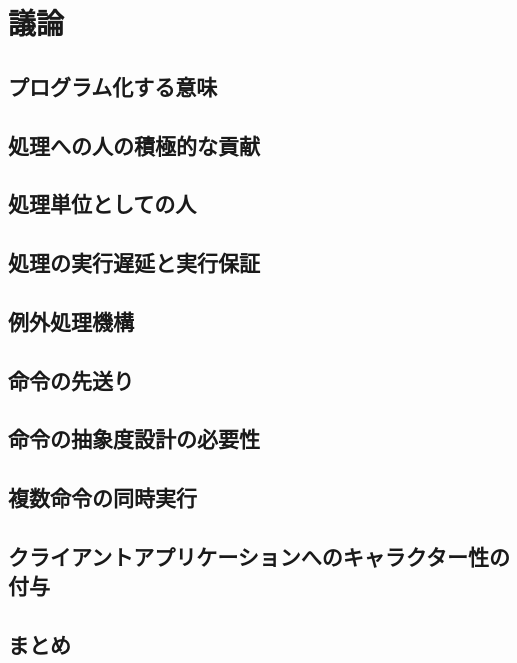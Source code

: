 \chapter{議論}
\label{chap:discussion}

\section{プログラム化する意味}\label{ux30d7ux30edux30b0ux30e9ux30e0ux5316ux3059ux308bux610fux5473}

\section{処理への人の積極的な貢献}\label{ux51e6ux7406ux3078ux306eux4ebaux306eux7a4dux6975ux7684ux306aux8ca2ux732e}

\section{処理単位としての人}\label{ux51e6ux7406ux5358ux4f4dux3068ux3057ux3066ux306eux4eba}

\section{処理の実行遅延と実行保証}\label{ux51e6ux7406ux306eux5b9fux884cux9045ux5ef6ux3068ux5b9fux884cux4fddux8a3c}

\section{例外処理機構}\label{ux4f8bux5916ux51e6ux7406ux6a5fux69cb}

\section{命令の先送り}\label{ux547dux4ee4ux306eux5148ux9001ux308a}

\section{命令の抽象度設計の必要性}\label{ux547dux4ee4ux306eux62bdux8c61ux5ea6ux8a2dux8a08ux306eux5fc5ux8981ux6027}

\section{複数命令の同時実行}\label{ux8907ux6570ux547dux4ee4ux306eux540cux6642ux5b9fux884c}

\section{クライアントアプリケーションへのキャラクター性の付与}\label{ux30afux30e9ux30a4ux30a2ux30f3ux30c8ux30a2ux30d7ux30eaux30b1ux30fcux30b7ux30e7ux30f3ux3078ux306eux30adux30e3ux30e9ux30afux30bfux30fcux6027ux306eux4ed8ux4e0e}

\section{まとめ}\label{ux307eux3068ux3081}
